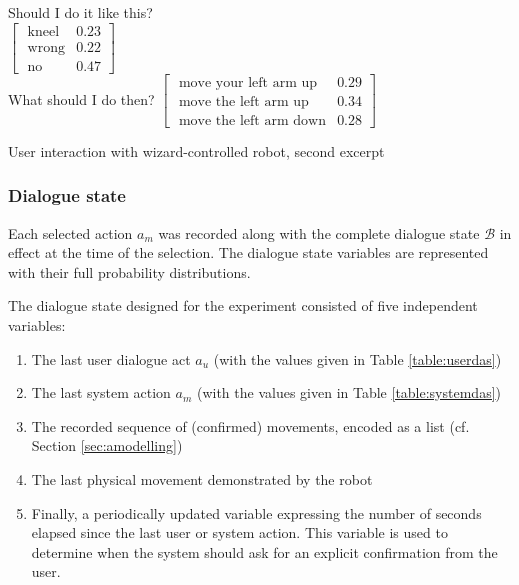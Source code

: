 \begin{Transcript}[p!]
\begin{dialogue}
 \vspace{3mm}
 Should I do it like this? \\
 $\begin{bmatrix}\text{ kneel} & 0.23 \\
\text{ wrong} & 0.22 \\
\text{ no} & 0.47 \end{bmatrix}$ \vspace{3mm} \\
 \vspace{2mm}
 What should I do then?  \vspace{3mm}
 $\begin{bmatrix}\text{ move your left arm up} & 0.29 \\
\text{ move the left arm up} & 0.34 \\
\text{ move the left arm down} & 0.28 \end{bmatrix}$ \vspace{3mm} \\
\end{dialogue}
\vspace{-4mm} \hspace{1cm}  \vspace{3mm}
\caption{User interaction with wizard-controlled robot, second excerpt}
\end{Transcript}

\subsubsection*{Dialogue state}

Each selected action $a_m$ was recorded along with the complete dialogue state $\mathcal{B}$ in effect at the time of the selection. The dialogue state variables are represented with their full probability distributions.

The dialogue state designed for the experiment consisted of five independent variables: \begin{enumerate}
\item The last user dialogue act $a_u$ (with the values given in Table \ref{table:userdas})
\item The last system action $a_m$ (with the values given in Table \ref{table:systemdas})
\item The recorded sequence of (confirmed) movements, encoded as a list (cf. Section \ref{sec:amodelling})
\item The last physical movement demonstrated by the robot
\item Finally, a periodically updated variable expressing the number of seconds elapsed since the last user or system action.  This variable is used to determine when the system should ask for an explicit confirmation from the user.
\end{enumerate}

